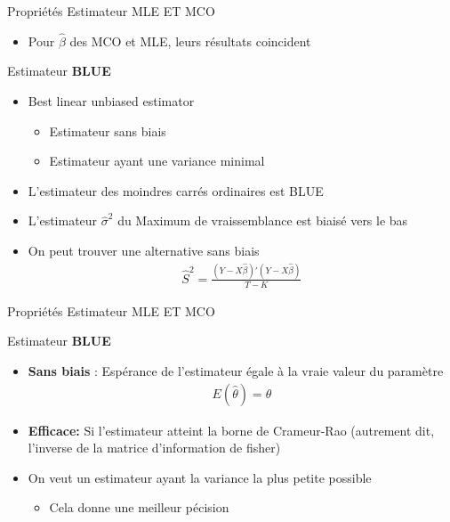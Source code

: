 \documentclass{beamer}
\begin{document}
\begin{frame}{Propriétés Estimateur MLE ET MCO}
\begin{itemize}
\item Pour $\hat{\beta}$ des MCO et MLE, leurs résultats coincident 
\end{itemize}
\begin{block}{Estimateur \textbf{BLUE}}
\begin{itemize}
\item Best linear unbiased estimator 
\begin{itemize}
\item Estimateur sans biais 
\item Estimateur ayant une variance minimal 
\end{itemize}
\item L'estimateur des moindres carrés ordinaires est BLUE 
\item L'estimateur $\hat{\sigma}^2$ du Maximum de vraissemblance est biaisé vers le bas 
\item On peut trouver une alternative sans biais 
\begin{align*}
\hat{S}^2=\frac{(Y-X \hat{\beta})'(Y-X \hat{\beta})}{T-K}
\end{align*}
\end{itemize}
\end{block}
\end{frame}

\begin{frame}{Propriétés Estimateur MLE ET MCO}
\begin{block}{Estimateur \textbf{BLUE}}
\begin{itemize}
\item \textbf{Sans biais} : Espérance de l'estimateur égale à la vraie valeur du paramètre
\begin{align*}
E(\hat{\theta})=\theta
\end{align*}
\item \textbf{Efficace:} Si l'estimateur atteint la borne de Crameur-Rao (autrement dit, l'inverse de la matrice d'information de fisher)
\item On veut un estimateur ayant la variance la plus petite possible
\begin{itemize}
\item Cela donne une meilleur pécision
\end{itemize}
\end{itemize}
\end{block}
\end{frame}
\end{document}
